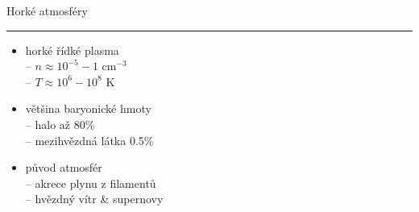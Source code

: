 \documentclass[aspectratio=43]{beamer}
\begin{document}
\begin{frame}{\vspace{-2mm}Horké atmosféry\phantom{j$^1$}\\\vspace{1.5mm}\hrule}
\vspace{2.5mm}
\begin{itemize}
    \item<1-> horké řídké plasma\\ \vspace{2.4mm}
        -- $n \approx 10^{-5} - 1$ cm$^{-3}$\\ \vspace{2.4mm}
        -- $T \approx 10^6 - 10^8$ K\\ \vspace{5mm}
    \item<1-> většina baryonické hmoty\\ \vspace{2.4mm}
        -- halo až 80\;\%\\ \vspace{2.4mm}
        -- mezihvězdná látka 0.5\;\%\\ \vspace{5mm}
    \item<3-> původ atmosfér\\ \vspace{2.4mm}
        -- akrece plynu z filamentů\\ \vspace{2.4mm}
        -- hvězdný vítr \& supernovy\\
\end{itemize}
\end{frame}
\end{document}

